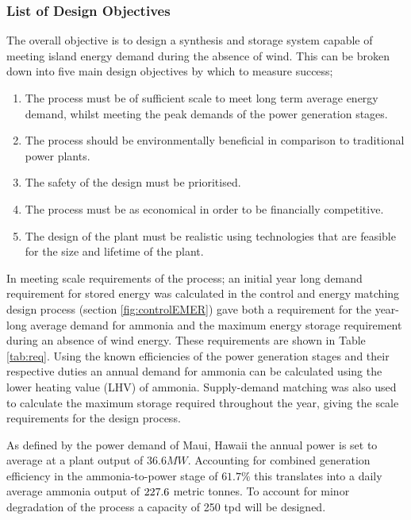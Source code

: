 \subsubsection{List of Design Objectives}

The overall objective is to design a synthesis and storage system capable of meeting island energy demand during the absence of wind. This can be broken down into five main design objectives by which to measure success;
\begin{enumerate}
	\item The process must be of sufficient scale to meet long term average energy demand, whilst meeting the peak demands of the power generation stages.
	\item The process should be environmentally beneficial in comparison to traditional power plants.
	\item The safety of the design must be prioritised.
	\item The process must be as economical in order to be financially competitive.
	\item The design of the plant must be realistic using technologies that are feasible for the size and lifetime of the plant. 
\end{enumerate}

In meeting scale requirements of the process; an initial year long demand requirement for stored energy was calculated in the control and energy matching design process (section \ref{fig:controlEMER}) gave both a requirement for the year-long average demand for ammonia and the maximum energy storage requirement during an absence of wind energy. These requirements are shown in Table \ref{tab:req}. Using the known efficiencies of the power generation stages and their respective duties an annual demand for ammonia can be calculated using the lower heating value (LHV) of ammonia. Supply-demand matching was also used to calculate the maximum storage required throughout the year, giving the scale requirements for the design process. 

As defined by the power demand of Maui, Hawaii the annual power is set to average at a plant output of $36.6MW$. Accounting for combined generation efficiency in the ammonia-to-power stage of $61.7\%$ this translates into a daily average ammonia output of $227.6$ metric tonnes. To account for minor degradation of the process a capacity of 250 tpd will be designed.

